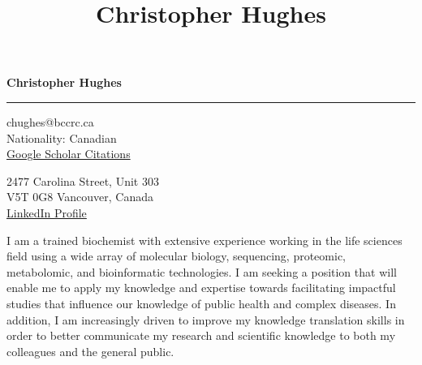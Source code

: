 \documentclass[11pt]{article}
\title{\bfseries\Huge Christopher Hughes}
\author{}
\date{}
\begin{document}
	\newpage
	\setcounter{page}{1}
	\noindent

\begin{LARGE}

	\noindent\textbf{Christopher Hughes}\vspace{1pt}

\end{LARGE}


\noindent\rule{\textwidth}{1pt}\vspace{9pt}

\noindent
\begin{minipage}{0.5\textwidth}
	\begin{flushleft}
		chughes@bccrc.ca\\
		Nationality: Canadian\\ \href{https://scholar.google.com/citations?user=jPSwBGwAAAAJ}{Google Scholar Citations}
	\end{flushleft}
\end{minipage}%
\begin{minipage}{0.5\textwidth}
	\begin{flushright}
		2477 Carolina Street, Unit 303\\
		V5T 0G8 Vancouver, Canada\\ \href{https://www.linkedin.com/in/christopher-hughes-612460133/}{LinkedIn Profile}
	\end{flushright}
\end{minipage}\vspace{18pt}


I am a trained biochemist with extensive experience working in the life sciences field using a wide array of molecular biology, sequencing, proteomic, metabolomic, and bioinformatic technologies. I am seeking a position that will enable me to apply my knowledge and expertise towards facilitating impactful studies that influence our knowledge of public health and complex diseases. In addition, I am increasingly driven to improve my knowledge translation skills in order to better communicate my research and scientific knowledge to both my colleagues and the general public.\\ 
\end{document}
